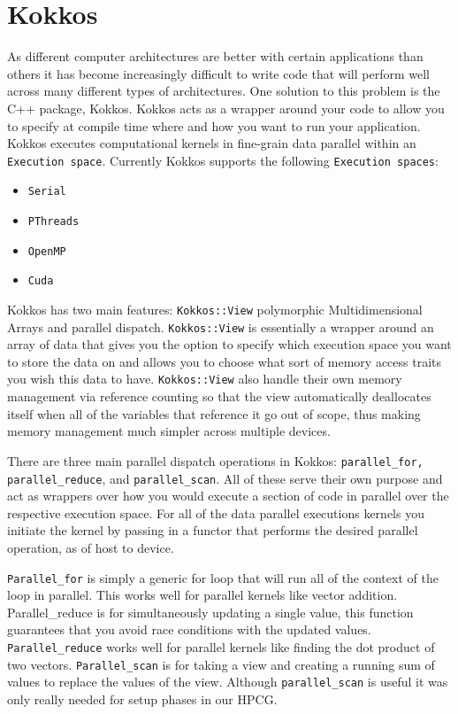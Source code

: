 \documentclass{ccr15}
\begin{document}
\section{Kokkos}
As different computer architectures are better with certain applications than others it has
become increasingly difficult to write code that will perform well across many different types of
architectures. One solution to this problem is the C++ package, Kokkos. Kokkos acts as a wrapper
around your code to allow you to specify at compile time where and how you want to run your
application. Kokkos executes computational kernels in fine-grain data parallel within an 
\texttt{Execution space}.
Currently Kokkos supports the following \texttt{Execution spaces}:
\begin{itemize}
\item \texttt{Serial}
\item \texttt{PThreads}\cite{ZAB:PThreads}
\item \texttt{OpenMP}\cite{ZAB:OpenMP}
\item \texttt{Cuda}\cite{ZAB:CUDA}
\end{itemize}

Kokkos has two main features: \texttt{Kokkos::View} polymorphic Multidimensional  Arrays and parallel dispatch.
  \texttt{Kokkos::View} is essentially a wrapper around
an array of data that gives you the option to specify which execution space you want to store the
data on and allows you to choose what sort of memory access traits you wish this data to have.
\texttt{Kokkos::View}  also handle their own memory management via reference counting so that the view
automatically deallocates itself when all of the variables that reference it go out of scope,
thus making memory management much simpler across multiple devices.

There are three main parallel dispatch operations in Kokkos: \texttt{parallel\_for,}  \texttt{parallel\_reduce}, and \texttt{parallel\_scan}. 
All of these serve their own purpose and act as wrappers over how you would execute a section of 
code in parallel over the respective execution space. 
For all of the data parallel executions kernels you initiate the kernel by passing in a functor 
that performs the desired parallel operation, as of  host to device.

\texttt{Parallel\_for} is simply a generic for loop that will run all of the context of the loop in
parallel. This works well for parallel kernels like vector addition. Parallel\_reduce is for
simultaneously updating a single value, this function guarantees that you avoid race conditions
with the updated values. \texttt{Parallel\_reduce} works well for parallel kernels like finding the dot
product of two vectors. \texttt{Parallel\_scan} is for taking a view and creating a running sum of values
to replace the values of the view. Although \texttt{parallel\_scan} is useful it was only really needed
for setup phases in our HPCG.
\end{document}
